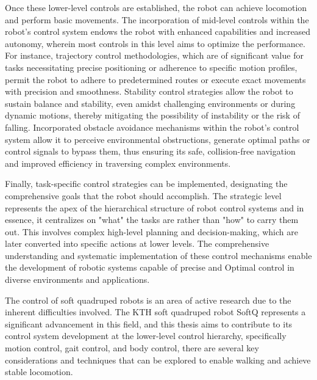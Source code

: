 Once these lower-level controls are established, the robot can achieve locomotion and perform basic movements. The incorporation of mid-level controls within the robot's control system endows the robot with enhanced capabilities and increased autonomy\cite{choiLearningQuadrupedalLocomotion2023}, wherein most controls in this level aims to optimize the performance. For instance, trajectory control methodologies\cite{leeTrajectoryDesignControl2017}, which are of significant value for tasks necessitating precise positioning or adherence to specific motion profiles, permit the robot to adhere to predetermined routes or execute exact movements with precision and smoothness. Stability control strategies allow the robot to sustain balance and stability\cite{sunBalanceControlQuadruped2022}, even amidst challenging environments or during dynamic motions, thereby mitigating the possibility of instability or the risk of falling. Incorporated obstacle avoidance mechanisms within the robot's control system allow it to perceive environmental obstructions\cite{liQuadrupedRobotObstacle2022}, generate optimal paths or control signals to bypass them, thus ensuring its safe, collision-free navigation and improved efficiency in traversing complex environments. 

Finally, task-specific control strategies can be implemented, designating the comprehensive goals that the robot should accomplish. The strategic level represents the apex of the hierarchical structure of robot control systems and in essence, it centralizes on "what" the tasks are rather than "how" to carry them out. This involves complex high-level planning and decision-making\cite{mikiLearningRobustPerceptive2022}, which are later converted into specific actions at lower levels. The comprehensive understanding and systematic implementation of these control mechanisms enable the development of robotic systems capable of precise and Optimal control in diverse environments and applications. 


The control of soft quadruped robots is an area of active research due to the inherent difficulties involved. The KTH soft quadruped robot SoftQ represents a significant advancement in this field, and this thesis aims to contribute to its control system development at the lower-level control hierarchy, specifically motion control, gait control, and body control, there are several key considerations and techniques that can be explored to enable walking and achieve stable locomotion. 

